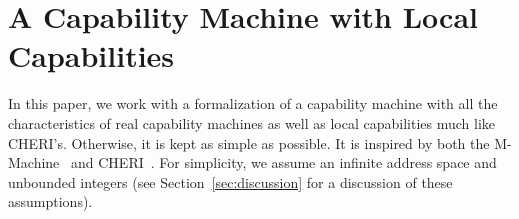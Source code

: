 \documentclass[format=acmsmall, review=true, screen=true]{acmart}
\renewcommand{\sectionname}{Section}
\begin{document}





\section{A Capability Machine with Local Capabilities}
\label{sec:capab-mach-with}
In this paper, we work with a formalization of a capability machine with all the characteristics of real capability machines as well as local capabilities much like CHERI's.
Otherwise, it is kept as simple as possible.
It is inspired by both the M-Machine~\citep{Carter:1994:HSF:195473.195579} and CHERI~\citep{Watson2015Cheri}.
For simplicity, we assume an
infinite address space and unbounded integers (see \sectionname~\ref{sec:discussion} for a discussion of these assumptions).
\end{document}
